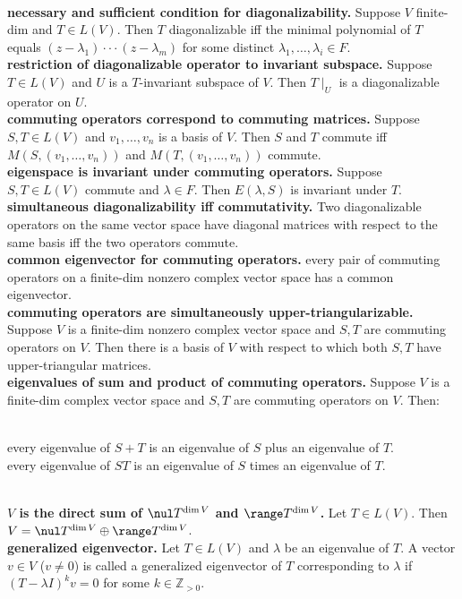 	\\ \textbf{necessary and sufficient condition for diagonalizability. } Suppose $V$ finite-dim and $T \in L(V)$. Then $T$ diagonalizable iff the minimal polynomial of $T$ equals $(z-\lambda_1) \cdot \cdot \cdot (z-\lambda_m)$ for some distinct $\lambda_1,\dots,\lambda_i \in F$. 
	\\ \textbf{restriction of diagonalizable operator to invariant subspace. } Suppose $T \in L(V)$ and $U$ is a $T$-invariant subspace of $V$. Then $T \mid_U$ is a diagonalizable operator on $U$. 
	\\ \textbf{commuting operators correspond to commuting matrices. } Suppose $S,T \in L(V)$ and $v_1,\dots,v_n$ is a basis of $V$. Then $S$ and $T$ commute iff $M(S,(v_1,\dots,v_n))$ and $M(T,(v_1,\dots,v_n))$ commute. 
	\\ \textbf{eigenspace is invariant under commuting operators. } Suppose $S,T \in L(V)$ commute and $\lambda \in F$. Then $E(\lambda,S)$ is invariant under $T$. 
	\\ \textbf{simultaneous diagonalizability iff commutativity. } Two diagonalizable operators on the same vector space have diagonal matrices with respect to the same basis iff the two operators commute. 
	\\ \textbf{common eigenvector for commuting operators. } every pair of commuting operators on a finite-dim nonzero complex vector space has a common eigenvector. 
	\\ \textbf{commuting operators are simultaneously upper-triangularizable. } Suppose $V$ is a finite-dim nonzero complex vector space and $S,T$ are commuting operators on $V$. Then there is a basis of $V$ with respect to which both $S,T$ have upper-triangular matrices. 
	\\ \textbf{eigenvalues of sum and product of commuting operators. } Suppose $V$ is a finite-dim complex vector space and $S,T$ are commuting operators on $V$. Then: 
	\begin{enumerate}
		\\ every eigenvalue of $S+T$ is an eigenvalue of $S$ plus an eigenvalue of $T$. 
		\\ every eigenvalue of $ST$ is an eigenvalue of $S$ times an eigenvalue of $T$. 
	\end{enumerate}
	\\ \textbf{$V$ is the direct sum of $\nul T^{\dim V}$ and $\range T^{\dim V}$. } Let $T \in L(V)$. Then $V = \nul T^{\dim V} \oplus \range T^{\dim V}$. 
	\\ \textbf{generalized eigenvector. } Let $T \in L(V)$ and $\lambda$ be an eigenvalue of $T$. A vector $v \in V$ ($v \neq 0$) is called a generalized eigenvector of $T$ corresponding to $\lambda$ if $(T - \lambda I)^k v = 0$ for some $k \in \mathbb{Z}_{>0}$. 
